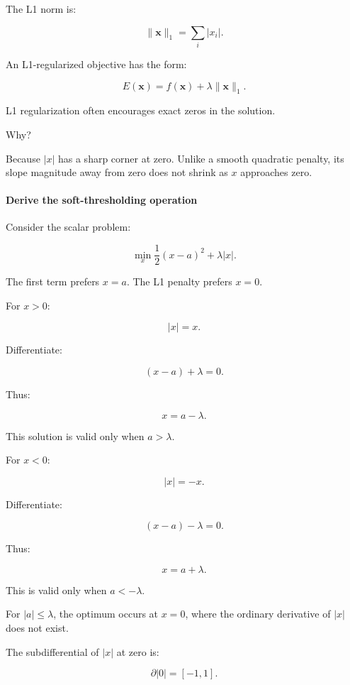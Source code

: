 \hypertarget{02-foundations-ii-ch027-l1-regularization-and-sparsity}{}

The L1 norm is:

\[
\boxed{ \|\mathbf x\|_1=\sum_i|x_i| }.
\]

An L1-regularized objective has the form:

\[
\boxed{ E(\mathbf x)= f(\mathbf x)+\lambda\|\mathbf x\|_1 }.
\]

L1 regularization often encourages exact zeros in the solution.

Why?

Because \(|x|\) has a sharp corner at zero. Unlike a smooth quadratic penalty, its slope magnitude away from zero does not shrink as \(x\) approaches zero.

\paragraph{Derive the soft-thresholding operation}\label{02-foundations-ii-ch027-derive-the-soft-thresholding-operation}

\hypertarget{02-foundations-ii-ch027-derive-the-soft-thresholding-operation}{}

Consider the scalar problem:

\[
\min_x \frac12(x-a)^2+\lambda|x|.
\]

The first term prefers \(x=a\). The L1 penalty prefers \(x=0\).

For \(x>0\):

\[
|x|=x.
\]

Differentiate:

\[
(x-a)+\lambda=0.
\]

Thus:

\[
x=a-\lambda.
\]

This solution is valid only when \(a>\lambda\).

For \(x<0\):

\[
|x|=-x.
\]

Differentiate:

\[
(x-a)-\lambda=0.
\]

Thus:

\[
x=a+\lambda.
\]

This is valid only when \(a<-\lambda\).

For \(|a|\le\lambda\), the optimum occurs at \(x=0\), where the ordinary derivative of \(|x|\) does not exist.

The subdifferential of \(|x|\) at zero is:

\[
\partial|0|=[-1,1].
\]

